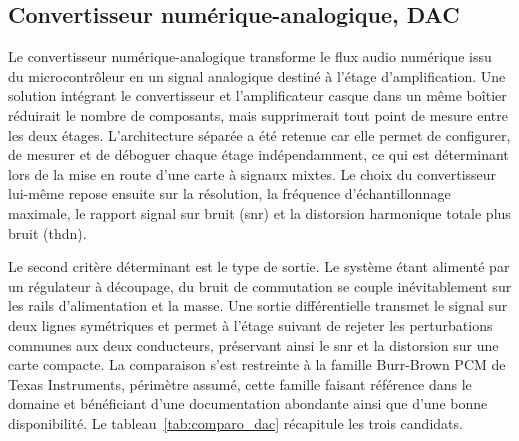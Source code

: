 


\subsection{Convertisseur numérique-analogique, DAC}

Le convertisseur numérique-analogique transforme le flux audio numérique issu du microcontrôleur en un signal analogique destiné à l'étage d'amplification. Une solution intégrant le convertisseur et l'amplificateur casque dans un même boîtier réduirait le nombre de composants, mais supprimerait tout point de mesure entre les deux étages. L'architecture séparée a été retenue car elle permet de configurer, de mesurer et de déboguer chaque étage indépendamment, ce qui est déterminant lors de la mise en route d'une carte à signaux mixtes. Le choix du convertisseur lui-même repose ensuite sur la résolution, la fréquence d'échantillonnage maximale, le rapport signal sur bruit (\gls{snr}) et la distorsion harmonique totale plus bruit (\gls{thdn}).

Le second critère déterminant est le type de sortie. Le système étant alimenté par un régulateur à découpage, du bruit de commutation se couple inévitablement sur les rails d'alimentation et la masse. Une sortie différentielle transmet le signal sur deux lignes symétriques et permet à l'étage suivant de rejeter les perturbations communes aux deux conducteurs, préservant ainsi le \gls{snr} et la distorsion sur une carte compacte. La comparaison s'est restreinte à la famille Burr-Brown PCM de Texas Instruments, périmètre assumé, cette famille faisant référence dans le domaine et bénéficiant d'une documentation abondante ainsi que d'une bonne disponibilité. Le tableau~\ref{tab:comparo_dac} récapitule les trois candidats.

